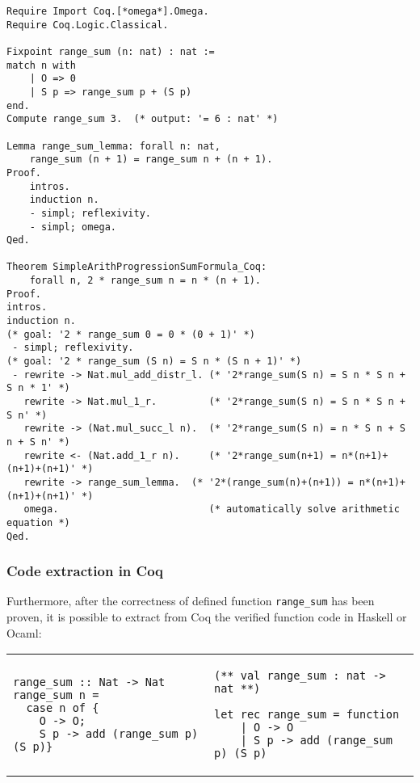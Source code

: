 \documentclass[article]{aaltoseries}
\begin{document}
\begin{lstlisting}[language=coq, caption={Proof of the formula for sum of n first number in Coq}, label={ex_nat_sum_coq}]
Require Import Coq.[*omega*].Omega.
Require Coq.Logic.Classical.

Fixpoint range_sum (n: nat) : nat :=
match n with
    | O => 0
    | S p => range_sum p + (S p)
end.
Compute range_sum 3.  (* output: '= 6 : nat' *)

Lemma range_sum_lemma: forall n: nat,
    range_sum (n + 1) = range_sum n + (n + 1).
Proof.
    intros.
    induction n.
    - simpl; reflexivity.
    - simpl; omega.
Qed.

Theorem SimpleArithProgressionSumFormula_Coq:
    forall n, 2 * range_sum n = n * (n + 1).
Proof.
intros.
induction n.
(* goal: '2 * range_sum 0 = 0 * (0 + 1)' *)
 - simpl; reflexivity.
(* goal: '2 * range_sum (S n) = S n * (S n + 1)' *)
 - rewrite -> Nat.mul_add_distr_l. (* '2*range_sum(S n) = S n * S n + S n * 1' *)
   rewrite -> Nat.mul_1_r.         (* '2*range_sum(S n) = S n * S n + S n' *)
   rewrite -> (Nat.mul_succ_l n).  (* '2*range_sum(S n) = n * S n + S n + S n' *)
   rewrite <- (Nat.add_1_r n).     (* '2*range_sum(n+1) = n*(n+1)+(n+1)+(n+1)' *)
   rewrite -> range_sum_lemma.  (* '2*(range_sum(n)+(n+1)) = n*(n+1)+(n+1)+(n+1)' *)
   omega.                          (* automatically solve arithmetic equation *)
Qed.
\end{lstlisting}


\subsubsection{Code extraction in Coq}
Furthermore, after the correctness of defined function \texttt{range\_sum} has been proven, it is possible to extract from Coq the verified function code in Haskell or Ocaml:

\begin{raggedleft}
\begin{tabular}{p{} p{}}
\begin{lstlisting}[caption={Extracted function in Haskell}]
range_sum :: Nat -> Nat
range_sum n =
  case n of {
    O -> O;
    S p -> add (range_sum p) (S p)}
\end{lstlisting} %
&
\begin{lstlisting}[caption={Extracted function in OCaml}]
(** val range_sum : nat -> nat **)

let rec range_sum = function
    | O -> O
    | S p -> add (range_sum p) (S p)
\end{lstlisting}
\end{tabular}
\end{raggedleft}
\end{document}
